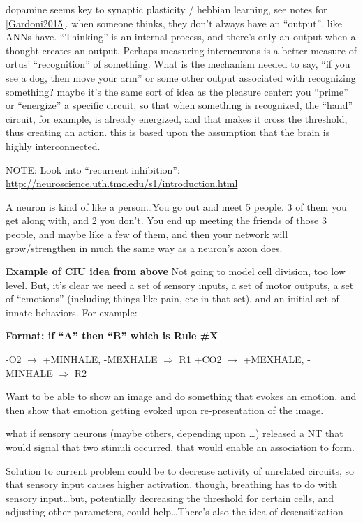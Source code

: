 \documentclass[11pt, a4paper, oneside]{article}   	%
\begin{document}
\begin{outline}
\point dopamine seems key to synaptic plasticity / hebbian learning, see notes for \ref{Gardoni2015}.
\point when someone thinks, they don't always have an ``output'', like ANNs have. ``Thinking'' is an internal process, and there's only an output when a thought creates an output. Perhaps measuring interneurons is a better measure of ortus' ``recognition'' of something. 
    \subpoint What is the mechanism needed to say, ``if you see a dog, then move your arm'' or some other output associated with recognizing something?
        \subsubpoint maybe it's the same sort of idea as the pleasure center: you ``prime'' or ``energize'' a specific circuit, so that when something is recognized, the ``hand'' circuit, for example, is already energized, and that makes it cross the threshold, thus creating an action.
            \supersubpoint this is based upon the assumption that the brain is highly interconnected.
\end{outline}


NOTE: Look into ``recurrent inhibition'': \url{http://neuroscience.uth.tmc.edu/s1/introduction.html}

A neuron is kind of like a person\ldots You go out and meet 5 people. 3 of them you get along with, and 2 you don't. You end up meeting the friends of those 3 people, and maybe like a few of them, and then your network will grow/strengthen in much the same way as a neuron's axon does.

\textbf{Example of CIU idea from above}
Not going to model cell division, too low level. But, it's clear we need a set of sensory inputs, a set of motor outputs, a set of ``emotions'' (including things like pain, etc in that set), and an initial set of innate behaviors. For example:

\textbf{Format: if ``A'' then ``B'' which is Rule \#X}
\begin{outline}
\point -O2 $\rightarrow$ +MINHALE, -MEXHALE $\Rightarrow$ R1
\point +CO2 $\rightarrow$ +MEXHALE, -MINHALE $\Rightarrow$ R2
\end{outline}

Want to be able to show an image and do something that evokes an emotion, and then show that emotion getting evoked upon re-presentation of the image. 


what if sensory neurons (maybe others, depending upon \ldots ) released a NT that would signal that two stimuli occurred. that would enable an association to form.


Solution to current problem could be to decrease activity of unrelated circuits, so that sensory input causes higher activation. though, breathing has to do with sensory input\ldots but, potentially decreasing the threshold for certain cells, and adjusting other parameters, could help\ldots There's also the idea of desensitization
\end{document}
